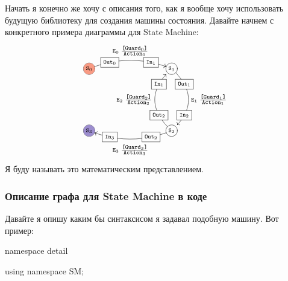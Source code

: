 \documentclass{article}
\begin{document}
{Начать я конечно же хочу с описания того, как я вообще хочу использовать будущую библиотеку для создания машины состояния.
Давайте начнем с конкретного примера диаграммы для State Machine:
\[
\xymatrix@R=60pt{
  *+=+[o][F*:InitialStateColor][F-]{\scriptstyle\texttt{S}_0}\ar@/^10pt/[rrr]^{\raisebox{6pt}{$\scriptstyle\texttt{E}_0\; \frac{\scriptstyle \texttt{[Guard}_0\texttt{]}}{\scriptstyle \texttt{Action}_0}$}}|(0.25){\boxed{\scriptstyle\texttt{Out}_0}}|(0.75){\boxed{\scriptstyle\texttt{In}_1}}
  &
  {}
  &
  {}
  &
  *+=+[o][F-]{\scriptstyle\texttt{S}_1}
    \ar@/^20pt/[d]^{\raisebox{0pt}{$\scriptstyle\texttt{E}_1\; \frac{\scriptstyle \texttt{[Guard}_1\texttt{]}}{\scriptstyle \texttt{Action}_1}$}}|(0.25){\boxed{\scriptstyle\texttt{Out}_1}}|(0.75){\boxed{\scriptstyle\texttt{In}_2}}
  \\
  *+=+[o][F*:FinalStateColor][F-]{\scriptstyle\texttt{S}_3}
  &
  {}
  &
  {}
  &
  *+=+[o][F-]{\scriptstyle\texttt{S}_2}
  \ar@/^10pt/[lll]^{\raisebox{-12pt}{$\scriptstyle\texttt{E}_3\; \frac{\scriptstyle \texttt{[Guard}_3\texttt{]}}{\scriptstyle \texttt{Action}_3}$}}|(0.25){\boxed{\scriptstyle\texttt{Out}_2}}|(0.75){\boxed{\scriptstyle\texttt{In}_3}}
      \ar@/^20pt/[u]^{\raisebox{0pt}{$\scriptstyle\texttt{E}_2\; \frac{\scriptstyle \texttt{[Guard}_2\texttt{]}}{\scriptstyle \texttt{Action}_2}$}}|(0.25){\boxed{\scriptstyle\texttt{Out}_2}}|(0.75){\boxed{\scriptstyle\texttt{In}_1}}
  \\
}
\]
Я буду называть это математическим представлением.

\subsubsection{Описание графа для State Machine в коде}

Давайте я опишу каким бы синтаксисом я задавал подобную машину.
Вот пример:
\begin{cppcode}
namespace detail {
using namespace SM;

}
\end{cppcode}}
\end{document}
